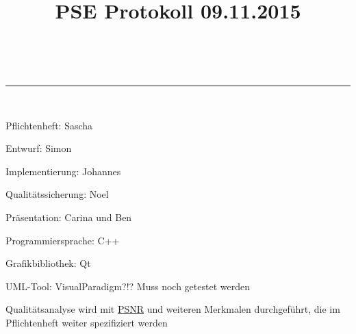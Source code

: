 \documentclass[parskip=full]{scrartcl}
\makeatletter
\newcommand{\linia}{\rule{\linewidth}{0.5pt}}
\theoremstyle{mytheor}
\renewcommand{\maketitle}{
\begin{center}
\vspace{2ex}
{\huge \textsc{\@title}}
\vspace{1ex}
\\
\linia\\
\@author \hfill \@date
\vspace{4ex}
\end{center}
}
\makeatother
\begin{document}
\title{PSE Protokoll 09.11.2015}

\maketitle

\begin{list}{•}{}
\item Pflichtenheft: Sascha
\item Entwurf: Simon
\item Implementierung: Johannes
\item Qualitätssicherung: Noel
\item Präsentation: Carina und Ben
\end{list}


Programmiersprache: C++

Grafikbibliothek: Qt

UML-Tool: VisualParadigm?!? Muss noch getestet werden

Qualitätsanalyse wird mit \href{https://en.wikipedia.org/wiki/Peak_signal-to-noise_ratio}{PSNR}  und weiteren Merkmalen durchgeführt, die im Pflichtenheft weiter spezifiziert werden
\end{document}

